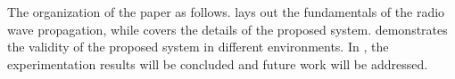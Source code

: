     The organization of the paper as follows.
     lays out the fundamentals of the radio wave propagation, while  covers the details of the proposed system.
     demonstrates the validity of the proposed system in different environments.
    In , the experimentation results will be concluded and future work will be addressed.
%
